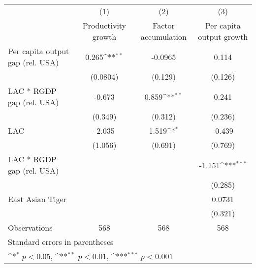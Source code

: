 {
\def\sym#1{\ifmmode^{#1}\else\(^{#1}\)\fi}
\begin{tabular}{l*{3}{c}}
\hline\hline
                    &\multicolumn{1}{c}{(1)}&\multicolumn{1}{c}{(2)}&\multicolumn{1}{c}{(3)}\\
                    &\multicolumn{1}{c}{Productivity growth}&\multicolumn{1}{c}{Factor accumulation}&\multicolumn{1}{c}{Per capita output growth}\\
\hline
Per capita output gap (rel. USA)&       0.265\sym{**} &     -0.0965         &       0.114         \\
                    &    (0.0804)         &     (0.129)         &     (0.126)         \\
[1em]
LAC * RGDP gap (rel. USA)&      -0.673         &       0.859\sym{**} &       0.241         \\
                    &     (0.349)         &     (0.312)         &     (0.236)         \\
[1em]
LAC                 &      -2.035         &       1.519\sym{*}  &      -0.439         \\
                    &     (1.056)         &     (0.691)         &     (0.769)         \\
[1em]
LAC * RGDP gap (rel. USA)&                     &                     &      -1.151\sym{***}\\
                    &                     &                     &     (0.285)         \\
[1em]
East Asian Tiger    &                     &                     &      0.0731         \\
                    &                     &                     &     (0.321)         \\
\hline
Observations        &         568         &         568         &         568         \\
\hline\hline
\multicolumn{4}{l}{\footnotesize Standard errors in parentheses}\\
\multicolumn{4}{l}{\footnotesize \sym{*} \(p<0.05\), \sym{**} \(p<0.01\), \sym{***} \(p<0.001\)}\\
\end{tabular}
}
